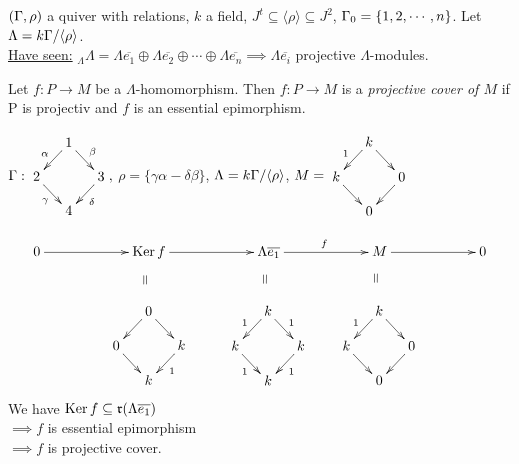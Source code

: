\begin{exam}
$(\Gamma, \rho)$ a quiver with relations, $k$ a field, $J^t \subseteq
\langle \rho \rangle \subseteq J^2$, $\Gamma_0 = \{ 1, 2, \cdots , n
\}$. Let $\Lambda = k\Gamma / \langle \rho \rangle$.\\ 
\underline{Have seen:} $_\Lambda\Lambda = \Lambda \overline{e_1}
\oplus \Lambda \overline{e_2} \oplus \cdots \oplus \Lambda
\overline{e_n} \implies \Lambda \overline{e_i}$ projective
$\Lambda$-modules. 
\end{exam}

\begin{defin}
  Let $f: P \to M$ be a $\Lambda$-homomorphism. Then $f:P\to M$ is a
  \emph{projective cover of $M$} if P is projectiv and $f$ is an
  essential epimorphism.
\end{defin}

\begin{exam}
$\G:
\vcenter{\xymatrix@C-1pc@R-1pc{
&1\ar[dl]_\alpha \ar[dr]^\beta&\\
2 \ar[dr]_\gamma&&3 \ar[dl]^\delta\\
&4&
}},$ 
$\rho = \{ \gamma\alpha -\delta\beta \}$, $\Lambda = k\Gamma / \langle \rho \rangle$, $M = \vcenter{\xymatrix@C-1pc@R-1pc{
&k\ar[dl]_1 \ar[dr]&\\
k \ar[dr]&&0 \ar[dl]\\
&0&
}}$

\[
\xy
\POS(0,0)
\xymatrix"seq"@C5pc{
0 \ar[r] & \Ker f \ar[r] & \Lambda \overline{e_1} \ar[r]^f & M \ar[r] & 0
}
\POS(20, -15)
\xymatrix@C-4pc@R-1pc{
&0\ar[dl] \ar[dr] \ar@{}["seq"]|-*[@]{=}&\\
0 \ar[dr]&&k \ar[dl]^1\\
&k&
}
\POS(50, -15)
\xymatrix{
&k\ar[dl]_1 \ar[dr]^1 \ar@{}["seq"r]|-*[@]{=}&\\
k \ar[dr]_1&&k \ar[dl]^1\\
&k&
}\POS(78, -15)
\xymatrix{
&k\ar[dl]_1 \ar[dr] \ar@{}["seq"rr]|-*[@]{=}&\\
k \ar[dr]&&0 \ar[dl]\\
&0&
}
\endxy
\]
We have $\operatorname{Ker}\nolimits f \subseteq \mathfrak{r}(\Lambda \overline{e_1})$\\
$\implies f$ is essential epimorphism\\
$\implies f$ is projective cover.
\end{exam}

